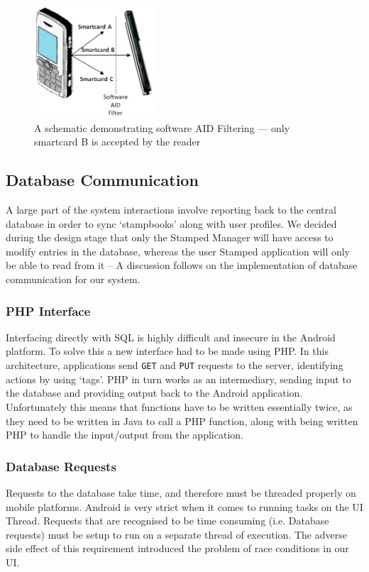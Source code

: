 \begin{figure}[H]
 \centering
  \includegraphics[width=0.40\textwidth]{img/aidfilter.png}
     \caption{A schematic demonstrating software AID Filtering --- only smartcard B is accepted by the reader}
     \label{fig:aidfilter}
\end{figure}

\subsection{Database Communication}
\label{sec:databasecommunication}
A large part of the system interactions involve reporting back to the central database in order to sync `stampbooks' along with user profiles. We decided during the design stage that only the Stamped Manager will have access to modify entries in the database, whereas the user Stamped application will only be able to read from it -- A discussion follows on the implementation of database communication for our system.
\subsubsection{PHP Interface}
Interfacing directly with SQL is highly difficult and insecure in the Android platform. To solve this a new interface had to be made using PHP. In this architecture, applications send \texttt{GET} and \texttt{PUT} requests to the server, identifying actions by using `tags'. PHP in turn works as an intermediary, sending input to the database and providing output back to the Android application. Unfortunately this means that functions have to be written essentially twice, as they need to be written in Java to call a PHP function, along with being written PHP to handle the input/output from the application.
\subsubsection{Database Requests}
Requests to the database take time, and therefore must be threaded properly on mobile platforms. Android is very strict when it comes to running tasks on the UI Thread. Requests that are recognised to be time consuming (i.e. Database requests) must be setup to run on a separate thread of execution. The adverse side effect of this requirement introduced the problem of race conditions in our UI.
